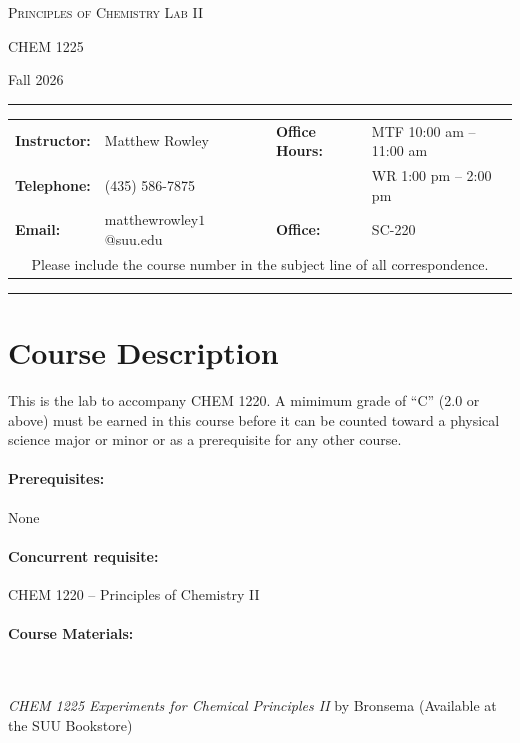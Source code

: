 \documentclass[12pt, letterpaper]{article}
\begin{document}
\begin{center}
	{\Large \textsc{Principles of Chemistry Lab II}}

	CHEM 1225
\end{center}

\begin{center}
	{\large Fall 2026}
\end{center}
\begin{center}
	\rule{0.99\textwidth}{0.4pt}
	\begin{tabular}{llcll}
		\textbf{Instructor:} & Matthew Rowley           &  & \textbf{Office Hours:} & MTF 10:00 am -- 11:00 am \\
		\textbf{Telephone:}  & (435) 586-7875           &  &                        & WR 1:00 pm -- 2:00 pm    \\
		\textbf{Email:}      & matthewrowley$1$@suu.edu &  & \textbf{Office:}       & SC-220                   \\
		\multicolumn{5}{c}{Please include the course number in the subject line of all correspondence.}
	\end{tabular}
	\rule{0.99\textwidth}{0.4pt}
\end{center}

\section*{Course Description}
This is the lab to accompany CHEM 1220. A mimimum grade of ``C'' (2.0 or above) must be earned in this course before it can be counted toward a physical science major or minor or as a prerequisite for any other course.

\paragraph{Prerequisites:}
None

\paragraph{Concurrent requisite:}
CHEM 1220 -- Principles of Chemistry II

\paragraph{Course Materials:} ~

\noindent\emph{CHEM 1225 Experiments for Chemical Principles II} by Bronsema (Available at the SUU Bookstore)

\medskip
\end{document}
